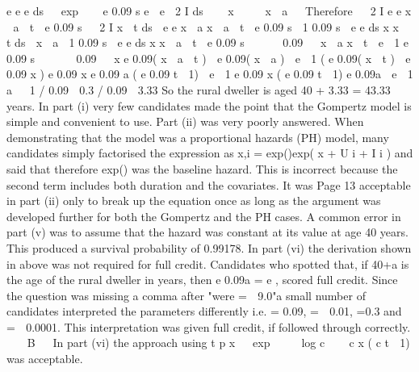 \documentclass[a4paper,12pt]{article}
\begin{document}
e e e ds   exp    e 0.09 s e  e  2 I ds 
  x
 
  x  a
 
Therefore
  2 I
e e
x  a  t

e
0.09 s
  2 I
x  t
ds  e e
x  a
x  a  t

e
0.09 s
 1 0.09 s
 e
e
ds
x
x  t
ds 
x  a
 1 0.09 s
 e
e
ds
x
x  a  t
 e 0.09 s 


  0.09   x  a
x  t
 e  1 e 0.09 s 


  0.09   x
e 0.09( x  a  t )  e 0.09( x  a )  e  1 ( e 0.09( x  t )  e 0.09 x )
e 0.09 x e 0.09 a ( e 0.09 t  1)  e  1 e 0.09 x ( e 0.09 t  1)
e 0.09a  e  1
a   1 / 0.09  0.3 / 0.09  3.33
So the rural dweller is aged 40 + 3.33 = 43.33 years.
In part (i) very few candidates made the point that the Gompertz model is simple and
convenient to use. Part (ii) was very poorly answered. When demonstrating that the model
was a proportional hazards (PH) model, many candidates simply factorised the expression as
\mu x,i = exp(\alpha)exp( x +  U i +  I i ) and said that therefore exp(\alpha) was the baseline hazard.
This is incorrect because the second term includes both duration and the covariates. It was
Page 13%
acceptable in part (ii) only to break up the equation once as long as the argument was
developed further for both the Gompertz and the PH cases. A common error in part (v) was
to assume that the hazard was constant at its value at age 40 years. This produced a survival
probability of 0.99178. In part (vi) the derivation shown in above was not required for full
credit. Candidates who spotted that, if 40+a is the age of the rural dweller in years,
then e 0.09a = e  , scored full credit.
Since the question was missing a comma after "were \alpha =  9.0"a small number of candidates
interpreted the parameters differently i.e. \alpha = 0.09,  =  0.01,  =0.3 and  =  0.0001.
This interpretation was given full credit, if followed through correctly.

  B  
In part (vi) the approach using t p x   exp 
 
 log c  

c x ( c t  1)
was acceptable.
\end{document}
